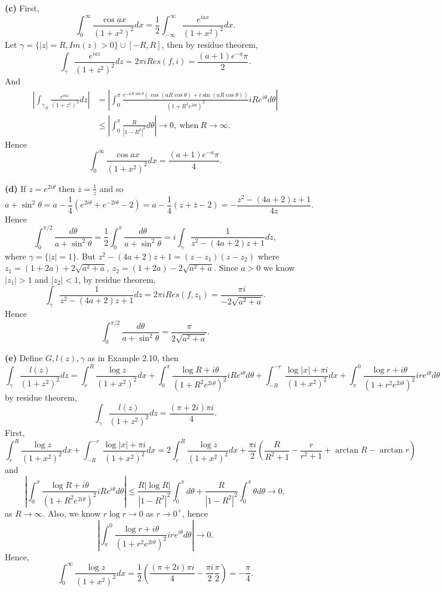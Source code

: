 \documentclass{article}%
\begin{document}
\begin{enumerate}
\textbf{(c)}
First,
$$
\int_{0}^{\infty}\frac{\cos ax}{(1+x^2)^2}dx = \frac{1}{2}\int_{-\infty}^{\infty}\frac{e^{iax}}{(1+x^2)^2}dx.
$$
Let $\gamma = \{|z|=R, Im(z) > 0\} \cup [-R, R]$, then by residue theorem,
$$
\int_{\gamma}\frac{e^{iaz}}{(1+z^2)^2}dz = 2\pi iRes(f, i) = \frac{(a+1)e^{-a}\pi}{2}.
$$
And
$$
\begin{aligned}
\left|\int_{\gamma_R}\frac{e^{iaz}}{(1+z^2)^2}dz\right| &= \left|\int_{0}^{\pi}\frac{e^{-aR\sin\theta}(\cos(aR\cos\theta)+i\sin(aR\cos\theta))}{(1+R^2e^{2i\theta})^2}iRe^{i\theta}d\theta\right| \\
&\le \left|\int_{0}^{\pi}\frac{R}{|1-R^2|^2}d\theta\right| \to 0, ~\text{when} ~R\to\infty.
\end{aligned}
$$
Hence
$$
\int_{0}^{\infty}\frac{\cos ax}{(1+x^2)^2}dx = \frac{(a+1)e^{-a}\pi}{4}.
$$

\textbf{(d)}
If $z = e^{2i\theta} $ then $\bar{z} = \frac{1}{z}$ and so
$$
a+\sin^2\theta = a-\frac{1}{4}(e^{2i\theta}+e^{-2i\theta}-2) = a-\frac{1}{4}(z+\bar{z}-2) = -\frac{z^2-(4a+2)z+1}{4z}.
$$
Hence
$$
\int_{0}^{\pi/2}\frac{d\theta}{a+\sin^2\theta} = \frac{1}{2}\int_{0}^{\pi}\frac{d\theta}{a+\sin^2\theta} = i\int_{\gamma}\frac{1}{z^2-(4a+2)z+1}dz,
$$
where $\gamma = \{|z| = 1\}$. But $z^2-(4a+2)z+1 = (z-z_1)(z-z_2) $ where $z_1 = (1+2a)+2\sqrt{a^2+a}, ~z_2 = (1+2a)-2\sqrt{a^2+a} $. Since $a > 0$ we know $|z_1| > 1 $ and $|z_2| < 1$, by residue theorem,
$$
\int_{\gamma}\frac{1}{z^2-(4a+2)z+1}dz = 2\pi iRes(f, z_1) = \frac{\pi i}{-2\sqrt{a^2+a}}.
$$
Hence
$$
\int_{0}^{\pi/2}\frac{d\theta}{a+\sin^2\theta} = \frac{\pi}{2\sqrt{a^2+a}}.
$$

\textbf{(e)}
Define $G, l(z), \gamma$ as in Example 2.10, then
$$
\int_{\gamma}\frac{l(z)}{(1+z^2)^2}dz = \int_{r}^{R}\frac{\log z}{(1+x^2)^2}dx +\int_{0}^{\pi}\frac{\log R +i\theta}{(1+R^2e^{2i\theta})^2}iRe^{i\theta}d\theta + \int_{-R}^{-r}\frac{\log |x|+\pi i}{(1+x^2)^2}dx + \int_{\pi}^{0}\frac{\log r +i\theta}{(1+r^2e^{2i\theta})^2}ire^{i\theta}d\theta
$$
by residue theorem,
$$
\int_{\gamma}\frac{l(z)}{(1+z^2)^2}dz = \frac{(\pi+2i)\pi i}{4}.
$$
First,
$$
\int_{r}^{R}\frac{\log z}{(1+x^2)^2}dx + \int_{-R}^{-r}\frac{\log |x|+\pi i}{(1+x^2)^2}dx = 2\int_{r}^{R}\frac{\log z}{(1+x^2)^2}dx + \frac{\pi i}{2}\left(\frac{R}{R^2+1}-\frac{r}{r^2+1}+\arctan R-\arctan r\right)
$$
and
$$
\left|\int_{0}^{\pi}\frac{\log R +i\theta}{(1+R^2e^{2i\theta})^2}iRe^{i\theta}d\theta\right| \le \frac{R|\log R|}{|1-R^2|^2}\int_{0}^{\pi}d\theta + \frac{R}{|1-R^2|^2}\int_{0}^{\pi}\theta d\theta \to 0,
$$
as $R\to \infty$. Also, we know $r\log r\to 0$ as $r\to 0^+ $, hence
$$
\left| \int_{\pi}^{0}\frac{\log r +i\theta}{(1+r^2e^{2i\theta})^2}ire^{i\theta}d\theta\right| \to 0.
$$
Hence,
$$
\int_{0}^{\infty}\frac{\log z}{(1+x^2)^2}dx = \frac{1}{2}\left(\frac{(\pi+2i)\pi i}{4}-\frac{\pi i}{2}\frac{\pi}{2}\right) = -\frac{\pi}{4}.
$$


\end{enumerate}
\end{document}
